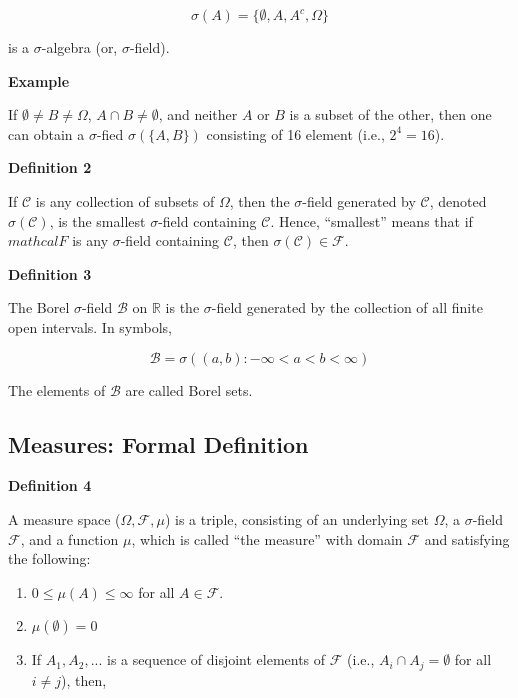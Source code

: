 \documentclass[
]{book}
\begin{document}
\[\sigma(A)=\{\emptyset, A, A^c, \Omega\}\]

is a \(\sigma\)-algebra (or, \(\sigma\)-field).

\textbf{Example}

If \(\emptyset \neq B \neq \Omega\), \(A\cap B \neq \emptyset\), and neither \(A\) or \(B\) is a subset of the other, then one can obtain a \(\sigma\)-fied \(\sigma(\{A, B\})\) consisting of 16 element (i.e., \(2^4=16\)).

\textbf{Definition 2}

If \(\mathcal{C}\) is any collection of subsets of \(\Omega\), then the \(\sigma\)-field generated by \(\mathcal{C}\), denoted \(\sigma(\mathcal{C})\), is the smallest \(\sigma\)-field containing \(\mathcal{C}\). Hence, ``smallest'' means that if \(mathcal{F}\) is any \(\sigma\)-field containing \(\mathcal{C}\), then \(\sigma(\mathcal{C}) \in \mathcal{F}\).

\textbf{Definition 3}

The Borel \(\sigma\)-field \(\mathcal{B}\) on \(\mathbb{R}\) is the \(\sigma\)-field generated by the collection of all finite open intervals. In symbols,

\[\mathcal{B}=\sigma({(a,b): -\infty < a <b< \infty})\]

The elements of \(\mathcal{B}\) are called Borel sets.

\hypertarget{measures-formal-definition}{%
\subsection{Measures: Formal Definition}\label{measures-formal-definition}}

\textbf{Definition 4}

A measure space (\(\Omega, \mathcal{F}, \mu\)) is a triple, consisting of an underlying set \(\Omega\), a \(\sigma\)-field \(\mathcal{F}\), and a function \(\mu\), which is called ``the measure'' with domain \(\mathcal{F}\) and satisfying the following:

\begin{enumerate}
\def\labelenumi{(\roman{enumi})}
\item
  \(0 \leq \mu(A) \leq \infty\) for all \(A \in \mathcal{F}\).
\item
  \(\mu(\emptyset)=0\)
\item
  If \(A_1, A_2,...\) is a sequence of disjoint elements of \(\mathcal{F}\) (i.e., \(A_i \cap A_j = \emptyset\) for all \(i \neq j\)), then,
\end{enumerate}
\end{document}
